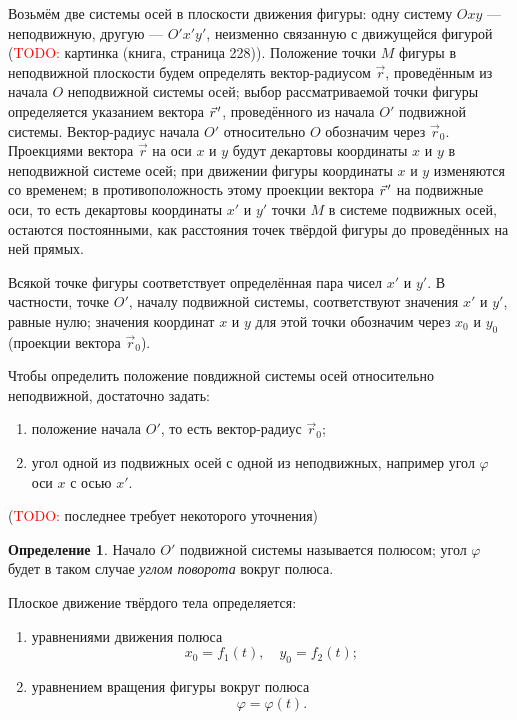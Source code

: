 \documentclass{article}
\theoremstyle{definition}
\newtheorem{definition}{Определение}[section]
\theoremstyle{plain}
\theoremstyle{remark}
\numberwithin{equation}{section}
\newcommand{\wvec}[1]{\vec{#1}\mkern2mu\vphantom{#1}}
\newcommand{\pvec}[1]{\wvec{#1}'}
\begin{document}
Возьмём две системы осей в плоскости движения фигуры: одну систему $Oxy$ ---
неподвижную, другую --- $O'x'y'$, неизменно связанную с движущейся фигурой
(\textcolor{red}{TODO:} картинка (книга, страница 228)). Положение точки $M$
фигуры в неподвижной плоскости будем определять вектор-радиусом $\vec{r}$,
проведённым из начала $O$ неподвижной системы осей; выбор рассматриваемой точки
фигуры определяется указанием вектора $\pvec{r}$, проведённого из начала $O'$
подвижной системы. Вектор-радиус начала $O'$ относительно $O$ обозначим через
$\vec{r}_0$. Проекциями вектора $\vec{r}$ на оси $x$ и $y$ будут декартовы
координаты $x$ и $y$ в неподвижной системе осей; при движении фигуры координаты
$x$ и $y$ изменяются со временем; в противоположность этому проекции вектора
$\pvec{r}$ на подвижные оси, то есть декартовы координаты $x'$ и $y'$ точки $M$
в системе подвижных осей, остаются постоянными, как расстояния точек твёрдой
фигуры до проведённых на ней прямых.

Всякой точке фигуры соответствует определённая пара чисел $x'$ и $y'$. В
частности, точке $O'$, началу подвижной системы, соответствуют значения $x'$ и
$y'$, равные нулю; значения координат $x$ и $y$ для этой точки обозначим через
$x_0$ и $y_0$ (проекции вектора $\vec{r}_0$).

Чтобы определить положение повдижной системы осей относительно неподвижной,
достаточно задать:
\begin{enumerate}
  \item положение начала $O'$, то есть вектор-радиус $\vec{r}_0$;
  \item угол одной из подвижных осей с одной из неподвижных, например угол
    $\varphi$ оси $x$ с осью $x'$.
\end{enumerate}
(\textcolor{red}{TODO:} последнее требует некоторого уточнения)

\begin{definition}
  Начало $O'$ подвижной системы называется $полюсом$; угол $\varphi$ будет в
  таком случае \textit{углом поворота} вокруг полюса.
\end{definition}

Плоское движение твёрдого тела определяется:
\begin{enumerate}
  \item уравнениями движения полюса
    \begin{equation}
      x_0 = f_1(t), \quad y_0 = f_2(t);
    \end{equation}
  \item уравнением вращения фигуры вокруг полюса
    \begin{equation}
      \varphi = \varphi(t).
    \end{equation}
\end{enumerate}
\end{document}
